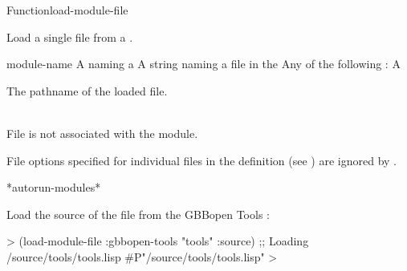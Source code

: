 \documentclass[10pt,twoside,english,pdftex]{article}
\begin{document}

\begin{functiondoc}{Function}{load-module-file}%
  { 
      
    \returns{} }
%
% 

\fnsyntax 

\fnpurpose Load a single file from a .

\fnpackage {}

\fnmodule {}

\fnargs
\begin{args}{module-name}
 A  naming a 
 A string naming a file in the 
\arg[option] Any of the following : 
\loadonefilemoduleoptions
\arg[pathname] A 
\end{args}

\fnreturns The pathname of the loaded file.

\fnerrors 
\modulenotdefined\\
%
File  is not associated with the module.

\relativedircircularity

\fndescription File options specified for individual files in the
 definition (see )
are ignored by .

\begin{alsos}{*autorun-modules*}
\end{alsos}

\fnexample Load the source of the file  from the GBBopen
Tools :
%
\W\supp
\begin{example}
  > (load-module-file :gbbopen-tools "tools" :source)
  ;; Loading /source/tools/tools.lisp
  #P"/source/tools/tools.lisp"
  >
\end{example}

\end{functiondoc}

\end{document}
